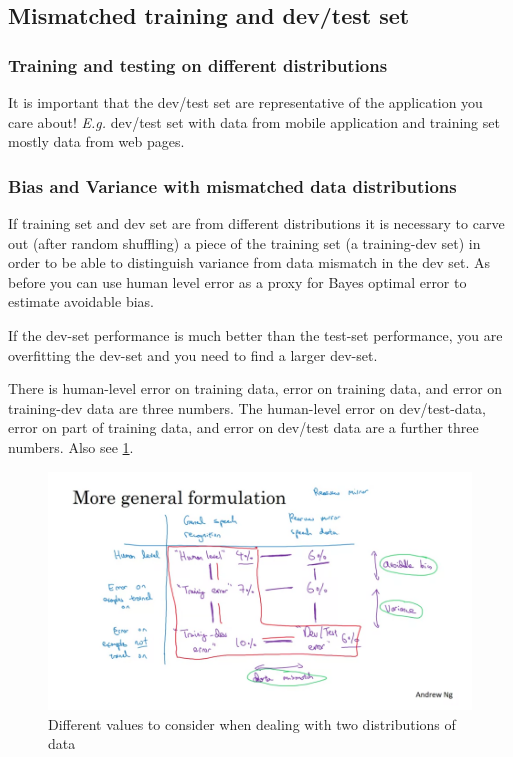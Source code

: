 \documentclass{article}
\begin{document}
\subsection{Mismatched training and dev/test set}
\subsubsection{Training and testing on different distributions}
It is important that the dev/test set are representative of the application you care about!
\emph{E.g.} dev/test set with data from mobile application and training set mostly data from web pages.

\subsubsection{Bias and Variance with mismatched data distributions}
If training set and dev set are from different distributions it is necessary to carve out (after random shuffling)
a piece of the training set (a training-dev set) in order to be able to distinguish variance from data mismatch in the dev set.
As before you can use human level error as a proxy for Bayes optimal error to estimate avoidable bias.

If the dev-set performance is much better than the test-set performance, you are overfitting the dev-set and you need to find a larger dev-set.

There is human-level error on training data, error on training data, and error on training-dev data are three numbers.
The human-level error on dev/test-data, error on part of training data, and error on dev/test data are a further three numbers.
Also see \cref{fig:mismatch}.
\begin{figure}[htbp]
  \begin{center}
    \includegraphics[width=\textwidth]{mismatch}
    \caption{Different values to consider when dealing with two distributions of data}
    \label{fig:mismatch}
  \end{center}
\end{figure}
\end{document}
